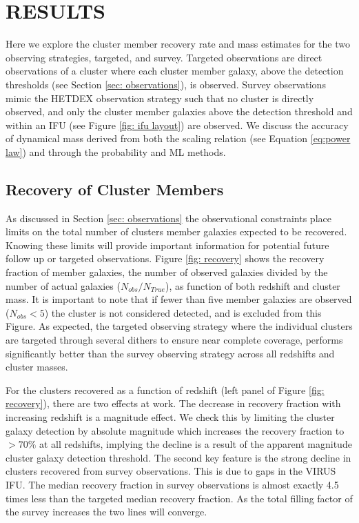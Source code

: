 \documentclass[fleqn,usenatbib]{mnras}
\begin{document}
\section{RESULTS}\label{sec:results}
Here we explore the cluster member recovery rate and mass estimates for the two observing strategies, targeted, and survey. Targeted observations are direct observations of a cluster where each cluster member galaxy, above the detection thresholds (see Section \ref{sec: observations}), is observed. Survey observations mimic the HETDEX observation strategy such that no cluster is directly observed, and only the cluster member galaxies above the detection threshold and within an IFU (see Figure \ref{fig: ifu layout}) are observed.  We discuss the accuracy of dynamical mass derived from both the scaling relation (see Equation \ref{eq:power law}) and through the probability and ML methods.

\subsection{Recovery of Cluster Members}
As discussed in Section \ref{sec: observations} the observational constraints place limits on the total number of clusters member galaxies expected to be recovered. Knowing these limits will provide important information for potential future follow up or targeted observations. Figure \ref{fig: recovery} shows the recovery fraction of member galaxies, the number of observed galaxies divided by the number of actual galaxies ($N_{obs}/N_{True}$), as function of both redshift and cluster mass. It is important to note that if fewer than five member galaxies are observed ($N_{obs} <5$) the cluster is not considered detected, and is excluded from this Figure. As expected, the targeted observing strategy where the individual clusters are targeted through several dithers to ensure near complete coverage, performs significantly better than the survey observing strategy across all redshifts and cluster masses. 

For the clusters recovered as a function of redshift (left panel of Figure \ref{fig: recovery}), there are two effects at work. The decrease in recovery fraction with increasing redshift is a magnitude effect. We check this by limiting the cluster galaxy detection by absolute magnitude which increases the recovery fraction to $>70\%$ at all redshifts, implying the decline is a result of the apparent magnitude cluster galaxy detection threshold. The second key feature is the strong decline in clusters recovered from survey observations. This is due to gaps in the VIRUS IFU. The median recovery fraction in survey observations is almost exactly 4.5 times less than the targeted median recovery fraction. As the total filling factor of the survey increases the two lines will converge.
\end{document}
